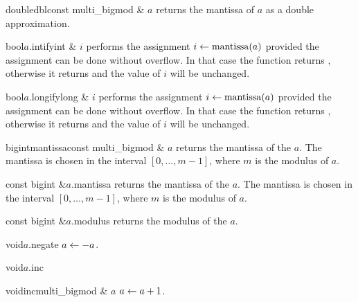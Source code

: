 \begin{fcode}{double}{dbl}{const multi_bigmod & $a$}
  returns the mantissa of $a$ as a double approximation.
\end{fcode}

\begin{cfcode}{bool}{$a$.intify}{int & $i$}
  performs the assignment $i \leftarrow \operatorname{mantissa}(a)$ provided the assignment can be done without
  overflow.  In that case the function returns \FALSE, otherwise it returns \TRUE and the value
  of $i$ will be unchanged.
\end{cfcode}

\begin{cfcode}{bool}{$a$.longify}{long & $i$}
  performs the assignment $i \leftarrow \operatorname{mantissa}(a)$ provided the assignment can be done without
  overflow.  In that case the function returns \FALSE, otherwise it returns \TRUE and the value
  of $i$ will be unchanged.
\end{cfcode}



\ACCS

\begin{fcode}{bigint}{mantissa}{const multi_bigmod & $a$}
  returns the mantissa of the  $a$.  The mantissa is chosen in the interval
  $[0, \dots, m-1]$, where $m$ is the modulus of $a$.
\end{fcode}

\begin{cfcode}{const bigint &}{$a$.mantissa}{}
  returns the mantissa of the  $a$.  The mantissa is chosen in the interval
  $[0, \dots, m-1]$, where $m$ is the modulus of $a$.
\end{cfcode}

\begin{cfcode}{const bigint &}{$a$.modulus}{}
  returns the modulus of the  $a$.
\end{cfcode}



\MODF

\begin{fcode}{void}{$a$.negate}{}
  $a \leftarrow -a$.
\end{fcode}

\begin{fcode}{void}{$a$.inc}{}
\end{fcode}
\begin{fcode}{void}{inc}{multi_bigmod & $a$}
  $a \leftarrow a + 1$.
\end{fcode}

